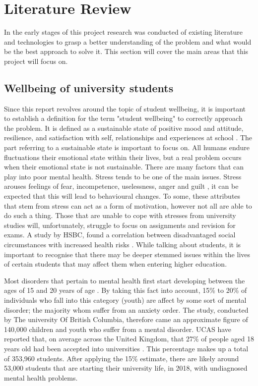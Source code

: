 \section{Literature Review}

In the early stages of this project research was conducted of existing literature and technologies to grasp a better understanding of the problem and what would be the best approach to solve it.
This section will cover the main areas that this project will focus on.

\subsection{Wellbeing of university students}

Since this report revolves around the topic of student wellbeing, it is important to establish a definition for the term "student wellbeing" to correctly approach the problem.
It is defined as a sustainable state of positive mood and attitude, resilience, and satisfaction with self, relationships and experiences at school \cite{noble2008scoping}.
The part referring to a sustainable state is important to focus on. All humans endure fluctuations their emotional state within their lives, but a real problem occurs when their emotional state is not sustainable.
There are many factors that can play into poor mental health. Stress tends to be one of the main issues. 
Stress arouses feelings of fear, incompetence, uselessness, anger and guilt \cite{turunen2014indoor}, it can be expected that this will lead to behavioural changes. 
To some, these attributes that stem from stress can act as a form of motivation, however not all are able to do such a thing.
Those that are unable to cope with stresses from university studies will, unfortunately, struggle to focus on assignments and revision for exams.
A study by HSBC, found a correlation between disadvantaged social circumstances with increased health risks \cite{currie2009social}.
While talking about students, it is important to recognise that there may be deeper stemmed issues within the lives of certain students that may affect them when entering higher education.

Most disorders that pertain to mental health first start developing between the ages of 15 and 20 years of age \cite{kessler2005lifetime}.
By taking this fact into account, 15\% to 20\% of individuals who fall into this category (youth\cite{youth2017definition}) are affect by some sort of mental disorder; the majority whom suffer from an anxiety order. 
The study, conducted by The university Of British Columbia, therefore came an approximate figure of 140,000 children and youth who suffer from a mental disorder. 
UCAS have reported that, on average across the United Kingdom, that 27\% of people aged 18 years old had been accepted into universities \cite{ucas_2018}.
This percentage makes up a total of 353,960 students. 
After applying the 15\% estimate, there are likely around 53,000 students that are starting their university life, in 2018, with undiagnosed mental health problems.

